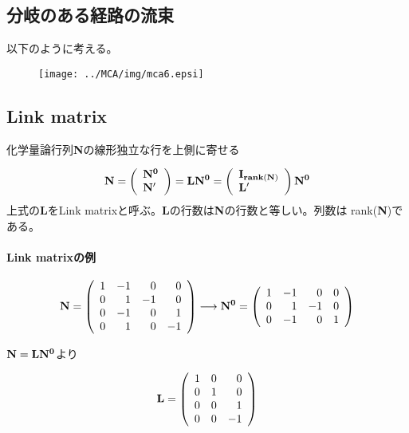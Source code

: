 \subsection{分岐のある経路の流束}
以下のように考える。
\begin{figure}[h]
\begin{center}
\texttt{[image: ../MCA/img/mca6.epsi]}
\end{center}
\end{figure}


\subsection{Link matrix}
化学量論行列{\bf N}の線形独立な行を上側に寄せる

\[
{\bf N}
=
\left(
\begin{array}{l}
{\bf N^0} \\
{\bf N^{\prime}}
\end{array}
\right)
=
{\bf LN^0}
=
\left(
\begin{array}{l}
{\bf I_{rank({\bf N})}} \\
{\bf L^{\prime}}
\end{array}
\right)
{\bf N^0}
\]
上式の{\bf L}をLink matrixと呼ぶ。{\bf L}の行数は{\bf N}の行数と等しい。列数は rank({\bf N})である。
\paragraph{Link matrixの例}
\[
{\bf N}
=
\left(
\begin{array}{rrrr}
1 & -1 & 0 & 0\\
0 & 1  & -1 & 0\\
0 & -1 & 0 & 1\\
0 & 1 & 0 & -1 \\
\end{array}
\right)
\longrightarrow
{\bf N^0}
=
\left(
\begin{array}{rrrr}
1 & -1 & 0 & 0\\
0 & 1  & -1 & 0\\
0 & -1 & 0 & 1\\
\end{array}
\right)
\]

\({\bf N = LN^0}\)より

\[
{\bf L}
=
\left(
\begin{array}{rrrr}
1 & 0 & 0\\
0 & 1 & 0\\
0 & 0 & 1\\
0 & 0 & -1\\
\end{array}
\right)
\]

